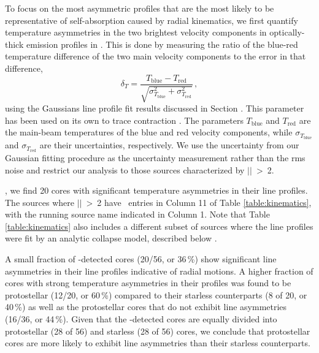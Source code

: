 \documentclass[iop,twocolappendix]{emulateapj}
\begin{document}
To focus on the most asymmetric profiles that are the most likely to be representative of self-absorption caused by radial kinematics, we first quantify temperature asymmetries in the two brightest velocity components in optically-thick {\HCO} emission profiles in \TMB. This is done by measuring the ratio of the blue-red temperature difference of the two main velocity components to the error in that difference, 
%
\begin{equation} \label{eq:deltaT}
{\delta}_T =  \frac{T_{\mathrm{blue}} - T_{\mathrm{red}}}{\sqrt{     {\sigma}_{T_{\mathrm{blue}}}^2 + {\sigma}_{T_{\mathrm{red}}}^2  }} \, ,
\end{equation}
%
using the Gaussians line profile fit results discussed in Section \edit{\ref{sec:results}}. This parameter has been used on its own to trace contraction \citep[e.g.,][]{Myers1995, Empr2009}. The parameters $T_\mathrm{blue}$ and $T_\mathrm{red}$ are the main-beam temperatures of the blue and red velocity components, while ${\sigma}_{T_\mathrm{blue}}$ and ${\sigma}_{T_\mathrm{red}}$ are their uncertainties, respectively. We use the uncertainty from our Gaussian fitting procedure as the uncertainty measurement rather than the rms noise \citep{Mardones1997} and restrict our analysis to those sources characterized by $|${\deltaT}$|$~{\textgreater}~2. 

,
we find 20 cores with significant temperature asymmetries in their {\HCO} line profiles.  The sources where $|${\deltaT}$|$~{\textgreater}~2 have \deltaV\ entries in Column 11 of Table \ref{table:kinematics}, with the running source name indicated in Column 1. Note that Table \ref{table:kinematics} also includes a different subset of sources where the line profiles were fit by an analytic collapse model, described below .  

A small fraction of \HCO-detected  cores (20/56, or 36\,\%) show significant line asymmetries in their line profiles indicative of radial motions. A higher fraction of  cores with strong temperature asymmetries in their {\HCO} profiles was found to be protostellar (12/20, or 60\,\%) compared to their starless counterparts (8 of 20, or 40\,\%) as well as the protostellar cores that do not exhibit line asymmetries (16/36, or 44\,\%). Given that the \HCO-detected  cores are equally divided into protostellar (28 of 56) and starless (28 of 56) cores, we conclude that protostellar cores are more likely to exhibit line asymmetries than their starless counterparts.
\end{document}
